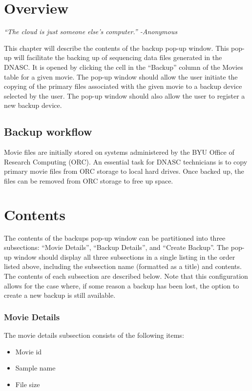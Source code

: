 
\section{Overview}

\vspace{3mm}
\emph{``The cloud is just someone else's computer.'' -Anonymous}
\vspace{3mm}

\noindent This chapter will describe the contents of the backup pop-up window.
This pop-up will facilitate the backing up of sequencing data files generated 
in the DNASC. It is opened by clicking the cell in the ``Backup'' column of the 
Movies table for a given movie. The pop-up window should allow the user initiate 
the copying of the primary files associated with the given movie to a backup device 
selected by the user. The pop-up window should also allow the user to register a new 
backup device.

\subsection{Backup workflow}
Movie files are initially stored on systems administered by the BYU Office of 
Research Computing (ORC). An essential task for DNASC technicians is to copy primary 
movie files from ORC storage to local hard drives. Once backed up, the files can be 
removed from ORC storage to free up space.

\section{Contents}

The contents of the backups pop-up window can be partitioned into three subsections: 
``Movie Details'', ``Backup Details'', and ``Create Backup''. The pop-up window should 
display all three subsections in a single listing in the order listed above, including 
the subsection name (formatted as a title) and contents. The contents of each subsection 
are described below. Note that this configuration allows for the case where, if some 
reason a backup has been lost, the option to create a new backup is still available.

\subsubsection{Movie Details}

The movie details subsection consists of the following items:
\begin{itemize}\itemsep1pt
  \item Movie id
  \item Sample name
  \item File size
\end{itemize}

